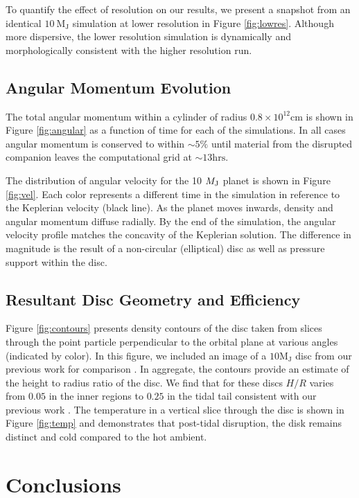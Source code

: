 \documentclass[fleqn,usenatbib]{mnras}
\begin{document}
To quantify the effect of resolution on our results, we present a snapshot from an identical $10\  \mathrm{M_J}$ simulation at lower resolution in Figure \ref{fig:lowres}. Although more dispersive, the lower resolution simulation is dynamically and morphologically consistent with the higher resolution run.

\subsection{Angular Momentum Evolution}

The total angular momentum within a cylinder of radius $\mathrm{0.8 \times10^{12} cm}$ is shown in Figure \ref{fig:angular} as a function of time for each of the simulations. In all cases angular momentum is conserved to within $\sim$$5\%$ until material from the disrupted companion leaves the computational grid at $\sim$$\mathrm{13 hrs}$.


The distribution of angular velocity for the 10 $M_{\rm J}$ planet is shown in Figure \ref{fig:vel}. Each color represents a different time in the simulation in reference to the Keplerian velocity (black line). As the planet moves inwards, density and angular momentum diffuse radially. By the end of the simulation, the angular velocity profile matches the concavity of the Keplerian solution. The difference in magnitude is the result of a non-circular (elliptical) disc as well as pressure support within the disc.

\subsection{Resultant Disc Geometry and Efficiency}

Figure \ref{fig:contours} presents density contours of the disc taken from slices through the point particle perpendicular to the orbital plane at various angles (indicated by color). In this figure, we included an image of a $10\mathrm{M_J}$ disc from our previous work for comparison \citep{Guidarelli2019}. In aggregate, the contours provide an estimate of the height to radius ratio of the disc. We find that for these discs $H/R$ varies from $0.05$ in the inner regions to $0.25$ in the tidal tail consistent with our previous work \citep{Guidarelli2019}. The temperature in a vertical slice through the disc is shown in Figure \ref{fig:temp} and demonstrates that post-tidal disruption, the disk remains distinct and cold compared to the hot ambient.

\section{Conclusions}
\end{document}
